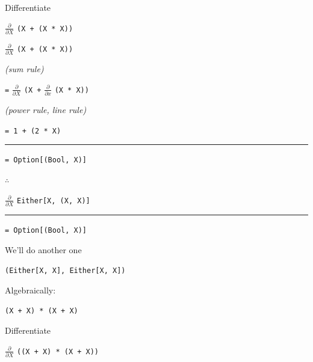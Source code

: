 \begin{frame}
\begin{center}
Differentiate

$\frac{\partial}{\partial X}$ \lstinline{(X + (X * X))}
\end{center}
\end{frame}


\begin{frame}
\begin{center}
$\frac{\partial}{\partial X}$ \lstinline{(X + (X * X))}

\tiny{\emph{(sum rule)}}\normalsize{}

\lstinline{=} $\frac{\partial}{\partial X}$ \lstinline{(X +} $\frac{\partial}{\partial x}$ \lstinline{(X * X))}

\tiny{\emph{(power rule, line rule)}}\normalsize{}

\lstinline{= 1 + (2 * X)}

\par\noindent\rule{\textwidth}{0.4pt}

\lstinline{= Option[(Bool, X)]}
\end{center}
\end{frame}


\begin{frame}
\begin{block}{$\therefore$}
\begin{center}
$\frac{\partial}{\partial X}$ \lstinline{Either[X, (X, X)]}

\par\noindent\rule{\textwidth}{0.4pt}

\lstinline{= Option[(Bool, X)]}
\end{center}
\end{block}
\end{frame}


\begin{frame}
\begin{center}
We'll do another one

\lstinline{(Either[X, X], Either[X, X])}
\end{center}
\end{frame}


\begin{frame}
\begin{center}
Algebraically:

\lstinline{(X + X) * (X + X)}
\end{center}
\end{frame}


\begin{frame}
\begin{center}
Differentiate

$\frac{\partial}{\partial X}$ \lstinline{((X + X) * (X + X))}
\end{center}
\end{frame}


